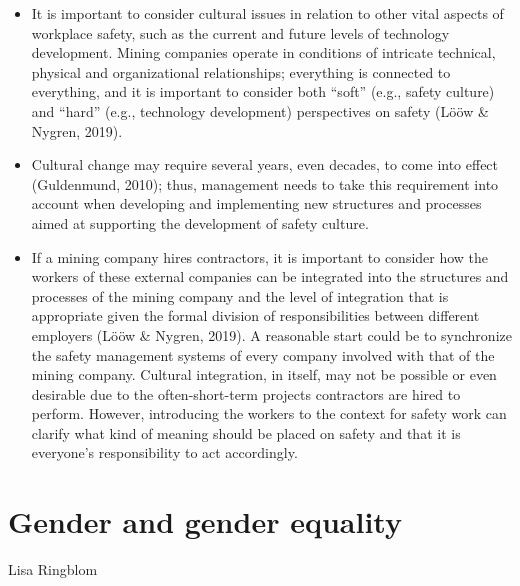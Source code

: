 \documentclass[
  12pt,
]{scrbook}
\newenvironment{chap-auth}
{\vspace{1cm}\begin{center}\begin{flushright}\sffamily\noindent}
  {\end{flushright}\end{center}\vspace{1cm}}
\begin{document}
\begin{itemize}
\item
  It is important to consider cultural issues in relation to other vital aspects of workplace safety, such as the current and future levels of technology development. Mining companies operate in conditions of intricate technical, physical and organizational relationships; everything is connected to everything, and it is important to consider both ``soft'' (e.g., safety culture) and ``hard'' (e.g., technology development) perspectives on safety (Lööw \& Nygren, 2019).
\item
  Cultural change may require several years, even decades, to come into effect (Guldenmund, 2010); thus, management needs to take this requirement into account when developing and implementing new structures and processes aimed at supporting the development of safety culture.
\item
  If a mining company hires contractors, it is important to consider how the workers of these external companies can be integrated into the structures and processes of the mining company and the level of integration that is appropriate given the formal division of responsibilities between different employers (Lööw \& Nygren, 2019). A reasonable start could be to synchronize the safety management systems of every company involved with that of the mining company. Cultural integration, in itself, may not be possible or even desirable due to the often-short-term projects contractors are hired to perform. However, introducing the workers to the context for safety work can clarify what kind of meaning should be placed on safety and that it is everyone's responsibility to act accordingly.
\end{itemize}

\hypertarget{gender-and-gender-equality}{%
\chapter{Gender and gender equality}\label{gender-and-gender-equality}}

\begin{chap-auth}
Lisa Ringblom
\end{chap-auth}
\end{document}
